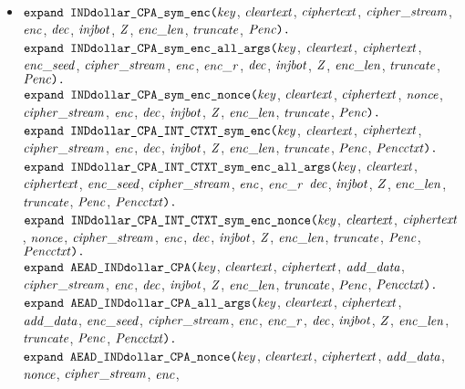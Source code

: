 \documentclass{article}
\begin{document}
\begin{itemize}
\item $\texttt{expand INDdollar\_CPA\_sym\_enc(}\mathit{key}$,
 $\mathit{cleartext}$, $\mathit{ciphertext}$, $\mathit{cipher\_stream}$, $\mathit{enc}$,
 $\mathit{dec}$, $\mathit{injbot}$, $\mathit{Z}$, $\mathit{enc\_len}$, $\mathit{truncate}$, $\mathit{Penc}\texttt{).}$\\
$\texttt{expand INDdollar\_CPA\_sym\_enc\_all\_args(}\mathit{key}$,
  $\mathit{cleartext}$, $\mathit{ciphertext}$, $\mathit{enc\_seed}$, $\mathit{cipher\_stream}$, $\mathit{enc}$, $\mathit{enc\_r}$, 
  $\mathit{dec}$, $\mathit{injbot}$, $\mathit{Z}$, $\mathit{enc\_len}$, $\mathit{truncate}$, $\mathit{Penc}\texttt{).}$\\
$\texttt{expand INDdollar\_CPA\_sym\_enc\_nonce(}\mathit{key}$,
  $\mathit{cleartext}$, $\mathit{ciphertext}$, $\mathit{nonce}$, $\mathit{cipher\_stream}$, $\mathit{enc}$,
  $\mathit{dec}$, $\mathit{injbot}$, $\mathit{Z}$, $\mathit{enc\_len}$, $\mathit{truncate}$, $\mathit{Penc}\texttt{).}$\\
$\texttt{expand INDdollar\_CPA\_INT\_CTXT\_sym\_enc(}\mathit{key}$,
  $\mathit{cleartext}$, $\mathit{ciphertext}$, $\mathit{cipher\_stream}$, $\mathit{enc}$,
  $\mathit{dec}$, $\mathit{injbot}$, $\mathit{Z}$, $\mathit{enc\_len}$, $\mathit{truncate}$, $\mathit{Penc}$, $\mathit{Pencctxt}\texttt{).}$\\
$\texttt{expand INDdollar\_CPA\_INT\_CTXT\_sym\_enc\_all\_args(}\mathit{key}$,
$  \mathit{cleartext}$, $\mathit{ciphertext}$, $\mathit{enc\_seed}$, $\mathit{cipher\_stream}$, $\mathit{enc}$, $\mathit{enc\_r}$
$  \mathit{dec}$, $\mathit{injbot}$, $\mathit{Z}$, $\mathit{enc\_len}$, $\mathit{truncate}$, $\mathit{Penc}$, $\mathit{Pencctxt}\texttt{).}$\\
$\texttt{expand INDdollar\_CPA\_INT\_CTXT\_sym\_enc\_nonce(}\mathit{key}$,
  $\mathit{cleartext}$, $\mathit{ciphertext}$, $\mathit{nonce}$, $\mathit{cipher\_stream}$, $\mathit{enc}$,
  $\mathit{dec}$, $\mathit{injbot}$, $\mathit{Z}$, $\mathit{enc\_len}$, $\mathit{truncate}$, $\mathit{Penc}$, $\mathit{Pencctxt}\texttt{).}$\\
$\texttt{expand AEAD\_INDdollar\_CPA(}\mathit{key}$,
$  \mathit{cleartext}$, $\mathit{ciphertext}$, $\mathit{add\_data}$, $\mathit{cipher\_stream}$, $\mathit{enc}$,
$  \mathit{dec}$, $\mathit{injbot}$, $\mathit{Z}$, $\mathit{enc\_len}$, $\mathit{truncate}$, $\mathit{Penc}$, $\mathit{Pencctxt}\texttt{).}$\\
$\texttt{expand AEAD\_INDdollar\_CPA\_all\_args(}\mathit{key}$,
$  \mathit{cleartext}$, $\mathit{ciphertext}$, $\mathit{add\_data}$, $\mathit{enc\_seed}$, $\mathit{cipher\_stream}$, $\mathit{enc}$, $\mathit{enc\_r}$,
$  \mathit{dec}$, $\mathit{injbot}$, $\mathit{Z}$, $\mathit{enc\_len}$, $\mathit{truncate}$, $\mathit{Penc}$, $\mathit{Pencctxt}\texttt{).}$\\
$\texttt{expand AEAD\_INDdollar\_CPA\_nonce(}\mathit{key}$,
$  \mathit{cleartext}$, $\mathit{ciphertext}$, $\mathit{add\_data}$, $\mathit{nonce}$, $\mathit{cipher\_stream}$, $\mathit{enc}$,

\end{itemize}
\end{document}
